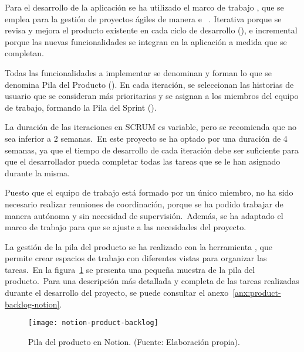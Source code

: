 
Para el desarrollo de la aplicación se ha utilizado el marco de trabajo , que se emplea para la gestión
de proyectos ágiles de manera  e ~\cite{scrum:book}.
Iterativa porque se revisa y mejora
el producto existente en cada ciclo de desarrollo (), e incremental porque las nuevas
funcionalidades se integran en la aplicación a medida que se completan.

Todas las funcionalidades a implementar se
denominan  y forman lo que se denomina Pila del Producto ().
En cada iteración, se seleccionan las historias de usuario que se consideran más prioritarias y se asignan a los
miembros del equipo de trabajo, formando la Pila del Sprint ().

La duración de las iteraciones en SCRUM es variable, pero se recomienda que no sea inferior a 2 semanas.\ En este
proyecto se ha optado por una duración de 4 semanas, ya que el tiempo de desarrollo de cada iteración debe ser
suficiente para que el desarrollador pueda completar todas las tareas que se le han asignado durante la misma.

Puesto que el equipo de trabajo está formado por un único miembro, no ha sido necesario realizar reuniones de
coordinación, porque se ha podido trabajar de manera autónoma y sin necesidad de supervisión.\ Además, se ha
adaptado el marco de trabajo para que se ajuste a las necesidades del proyecto.

La gestión de la pila del producto se ha realizado con la herramienta , que permite crear espacios
de trabajo con diferentes vistas para organizar las tareas.\ En la figura~\ref{fig:notion-product-backlog} se presenta
una pequeña muestra de la pila del producto.\ Para una descripción más detallada y completa de las tareas realizadas
durante el desarrollo del proyecto, se puede consultar el anexo~\ref{anx:product-backlog-notion}.

\begin{figure}[H]
	\centering
	\texttt{[image: notion-product-backlog]}
	\caption{Pila del producto en Notion. (Fuente: Elaboración propia).}
	\label{fig:notion-product-backlog}
\end{figure}
